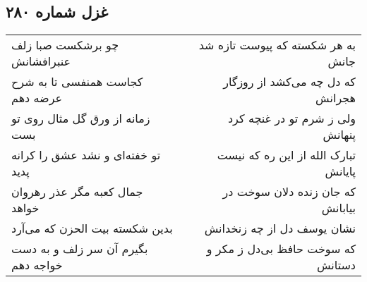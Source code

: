 \begin{center}
\section*{غزل شماره ۲۸۰}
\label{sec:sh280}
\begin{longtable}{l p{0.5cm} r}
چو برشکست صبا زلف عنبرافشانش
&&
به هر شکسته که پیوست تازه شد جانش
\\
کجاست همنفسی تا به شرح عرضه دهم
&&
که دل چه می‌کشد از روزگار هجرانش
\\
زمانه از ورق گل مثال روی تو بست
&&
ولی ز شرم تو در غنچه کرد پنهانش
\\
تو خفته‌ای و نشد عشق را کرانه پدید
&&
تبارک الله از این ره که نیست پایانش
\\
جمال کعبه مگر عذر رهروان خواهد
&&
که جان زنده دلان سوخت در بیابانش
\\
بدین شکسته بیت الحزن که می‌آرد
&&
نشان یوسف دل از چه زنخدانش
\\
بگیرم آن سر زلف و به دست خواجه دهم
&&
که سوخت حافظ بی‌دل ز مکر و دستانش
\\
\end{longtable}
\end{center}
